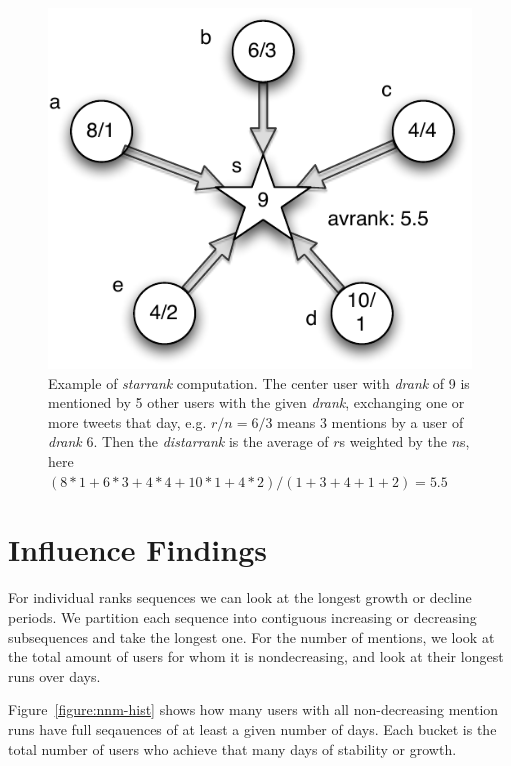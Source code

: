 \documentclass[10pt,oneside]{memoir}
\begin{document}
\begin{figure}
\begin{center}
\includegraphics{figures/starrank}  
\caption{Example of \emph{starrank} computation.  The center user with \emph{drank} of 9 is mentioned by 5 other users with the given \emph{drank}, exchanging one or more tweets that day, e.g. $r/n=6/3$ means 3 mentions by a user of \emph{drank} 6.  Then the \emph{distarrank} is the average of $r$s weighted by the $n$s, here $(8*1+6*3+4*4+10*1+4*2)/(1+3+4+1+2)=5.5$}
\label{figure:starrank}
\end{center}
\end{figure}
\pagebreak \section{Influence Findings}
\label{influencefindings}

For individual ranks sequences we can look at the longest growth or decline periods.  We partition each sequence into contiguous increasing or decreasing subsequences and take the longest one.  For the number of mentions, we look at the total amount of users for whom it is nondecreasing, and look at their longest runs over days.  


Figure~\ref{figure:nnm-hist} shows how many users with all non-decreasing mention runs have full seqauences of at least a given number of days.  Each bucket is the total number of users who achieve that many days of stability or growth.
\end{document}
